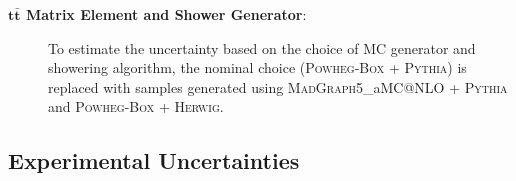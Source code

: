 \begin{description}

\item[\textbf{$\textbf{t}\bar{\textbf{t}}$ Matrix Element and Shower Generator}:]  To estimate the uncertainty based on the choice of MC generator and showering algorithm, the nominal choice (\textsc{Powheg-Box + Pythia}) is replaced with samples generated using \textsc{MadGraph5\_}a\textsc{MC@NLO + Pythia} and \textsc{Powheg-Box + Herwig}.
\end{description}

\subsection{Experimental Uncertainties}

